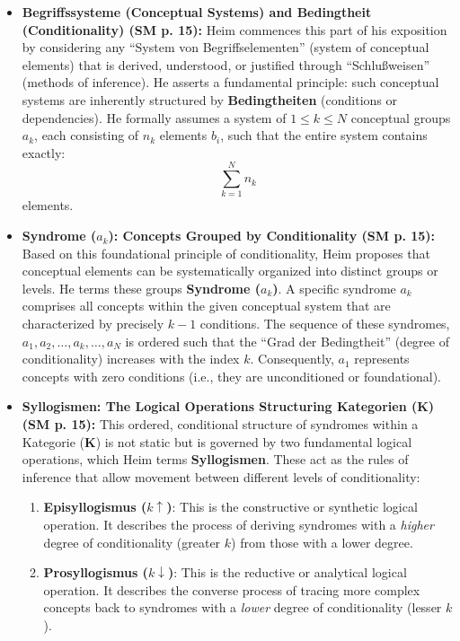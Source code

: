 \documentclass[12pt]{article}
\newcommand{\q}[1]{\enquote{#1}}
\newcommand{\kategorie}{\bm{K}}
\newcommand{\conceptualsyndrome}{a}
\begin{document}
\begin{itemize}
    \item \textbf{Begriffssysteme (Conceptual Systems) and Bedingtheit (Conditionality) (SM p. 15):}
    Heim commences this part of his exposition by considering any \q{System von Begriffselementen} (system of conceptual elements) that is derived, understood, or justified through \q{Schlußweisen} (methods of inference). He asserts a fundamental principle: such conceptual systems are inherently structured by \textbf{Bedingtheiten} (conditions or dependencies). He formally assumes a system of \(1 \le k \le N\) conceptual groups \(a_k\), each consisting of \(n_k\) elements \(b_i\), such that the entire system contains exactly:
    \begin{equation*}
    \sum_{k=1}^N n_k
    \end{equation*}
    elements. 

    \item \textbf{Syndrome (\( \conceptualsyndrome_k \)): Concepts Grouped by Conditionality (SM p. 15):}
    Based on this foundational principle of conditionality, Heim proposes that conceptual elements can be systematically organized into distinct groups or levels. He terms these groups \textbf{Syndrome (\(\conceptualsyndrome_k\))}. A specific syndrome \( \conceptualsyndrome_k \) comprises all concepts within the given conceptual system that are characterized by precisely \( k-1 \) conditions. The sequence of these syndromes, \( \conceptualsyndrome_1, \conceptualsyndrome_2, \dots, \conceptualsyndrome_k, \dots, \conceptualsyndrome_N \) is ordered such that the \q{Grad der Bedingtheit} (degree of conditionality) increases with the index \( k \). Consequently, \( \conceptualsyndrome_1 \) represents concepts with zero conditions (i.e., they are unconditioned or foundational).

    \item \textbf{Syllogismen: The Logical Operations Structuring Kategorien (\(\kategorie\)) (SM p. 15):}
    This ordered, conditional structure of syndromes within a Kategorie (\(\kategorie\)) is not static but is governed by two fundamental logical operations, which Heim terms \textbf{Syllogismen}. These act as the rules of inference that allow movement between different levels of conditionality:
    \begin{enumerate}
        \item \textbf{Episyllogismus (\( k \uparrow \))}: This is the constructive or synthetic logical operation. It describes the process of deriving syndromes with a \textit{higher} degree of conditionality (greater \(k\)) from those with a lower degree. 
        \item \textbf{Prosyllogismus (\( k \downarrow \))}: This is the reductive or analytical logical operation. It describes the converse process of tracing more complex concepts back to syndromes with a \textit{lower} degree of conditionality (lesser \(k\)). 
    \end{enumerate}


\end{itemize}
\end{document}
